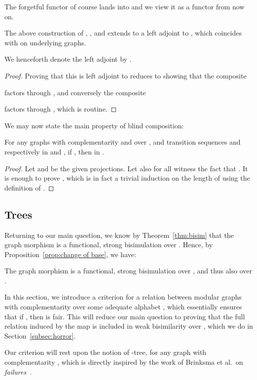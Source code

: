 \documentclass{LMCS}
\theoremstyle{plain}\newtheorem{satz}[thm]{Satz}
\begin{document}
  The forgetful functor  of course lands into  and
  we view it as a functor  from now on.
  \begin{prop}
    The above construction of ,
    , and  extends to a left
    adjoint to , which coincides with  on
    underlying graphs.
  \end{prop}
  We henceforth denote the left adjoint by . 
\begin{proof}
  Proving that this is left adjoint to  reduces to showing
  that the composite
  
  factors through , and conversely the composite
  
  factors through ,
  which is routine.
\end{proof}

We may now state the main property of blind composition:
\begin{prop}\label{prop:combinecombine}
  For any graphs with complementarity  and  over , and
  transition sequences  and  respectively in  and , if
  , then  in .
\end{prop}
\begin{proof}
  Let  and  be the given
  projections. Let also  for
  all  witness the fact that .  It is enough to prove , which is in fact a
  trivial induction on the length of  using the definition of
  .
\end{proof}


\subsection{Trees}
Returning to our main question, we know by Theorem~\ref{thm:bisim}
that the graph morphism  is a functional, strong
bisimulation over . Hence, by Proposition~\ref{prop:change of
  base}, we have:
\begin{prop}\label{prop:strongbisima}
  The graph morphism  is a functional, strong
  bisimulation over , and thus also over .
\end{prop}
In this section, we introduce a criterion for a relation  between modular graphs with complementarity over some
adequate alphabet , which essentially ensures that if , then  is fair.  This will reduce our main question to
proving that the full relation induced by the map 
is included in weak bisimilarity over , which we do in
Section~\ref{subsec:horror}.

Our criterion will rest upon the notion of -tree, for any graph
with complementarity , which is directly inspired by the work of
Brinksma et al.\ on
\emph{failures}~\cite{DBLP:journals/iandc/RensinkV07}.
\end{document}
